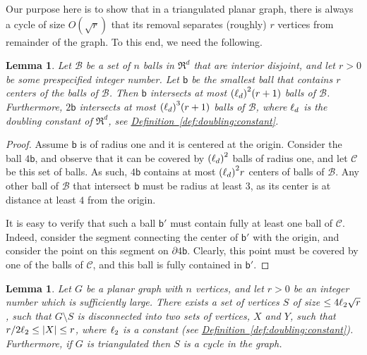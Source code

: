 \documentclass[12pt]{article}
\newtheorem{lemma}[theorem]{Lemma}
\theoremstyle{remark}\theoremheaderfont{\sf}\theorembodyfont{\upshape}\newtheorem{defn}[theorem]{Definition}
\renewcommand{\Re}{\mathbb{R}}
\newcommand{\HLink}[2]{\hyperref[#2]{#1~\ref*{#2}}}
\newcommand{\lemlab}[1]{\label{lemma:#1}}
\newcommand{\defref}[1]{\HLink{Definition}{def:#1}}
\newcommand{\BallSet}{\mathcal{B}}\newcommand{\BallSetA}{\mathcal{C}}
\newcommand{\SepSet}{S}
\newcommand{\ball}{\mathsf{b}}\newcommand{\ballA}{\mathsf{b'}}
\newcommand{\Graph}{{G}}
\newcommand{\pth}[1]{\mleft({#1}\mright)}
\newcommand{\cardin}[1]{\left| {#1} \right|}\newcommand{\norm}[1]{\left\| {#1} \right\|}
\begin{document}
Our purpose here is to show that in a triangulated planar graph, there
is always a cycle of size $O(\sqrt{r})$ that its removal separates
(roughly) $r$ vertices from remainder of the graph. To this end, we
need the following.

\begin{lemma}\lemlab{packing:r}Let $\BallSet$ be a set of $n$ balls in $\Re^d$ that are interior
    disjoint, and let $r> 0 $ be some prespecified integer number.
    Let $\ball$ be the smallest ball that contains $r$ centers of the
    balls of $\BallSet$. Then $\ball$ intersects at most
    $\pth{\constDbl}^2 \pth{r + 1} $ balls of $\BallSet$. Furthermore,
    $2\ball$ intersects at most $\pth{\constDbl}^3 \pth{r + 1} $
    balls of $\BallSet$, where $\ell_d$ is the doubling constant of
    $\Re^d$, see \defref{doubling:constant}.
\end{lemma}
\begin{proof}
    Assume $\ball$ is of radius one and it is centered at the
    origin. Consider the ball $4\ball$, and observe that it can be
    covered by $\pth{\constDbl}^2$ balls of radius one, and let
    $\BallSetA$ be this set of balls. As such, $4\ball$ contains at
    most $\pth{\constDbl}^2 r$ centers of balls of $\BallSet$. Any
    other ball of $\BallSet$ that intersect $\ball$ must be radius at
    least $3$, as its center is at distance at least $4$ from the
    origin.

    It is easy to verify that such a ball $\ball'$ must contain fully
    at least one ball of $\BallSetA$. Indeed, consider the segment
    connecting the center of $\ball'$ with the origin, and consider
    the point on this segment on $\partial 4\ball$. Clearly, this
    point must be covered by one of the balls of $\BallSetA$, and this
    ball is fully contained in $\ball'$.
\end{proof}

\begin{lemma}
    Let $\Graph$ be a planar graph with $n$ vertices, and let $r > 0$
    be an integer number which is sufficiently large. There exists a
    set of vertices $\SepSet$ of size $\leq 4 \ell_2 \sqrt{r}$,
    such that $\Graph \setminus \SepSet$ is disconnected into two sets
    of vertices, $X$ and $Y$, such that $r/2\constDblTwo \leq
    \cardin{X} \leq r$, where $\ell_2$ is a constant (see
    \defref{doubling:constant}).  Furthermore, if $\Graph$ is
    triangulated then $\SepSet$ is a cycle in the graph.
\end{lemma}
\end{document}
